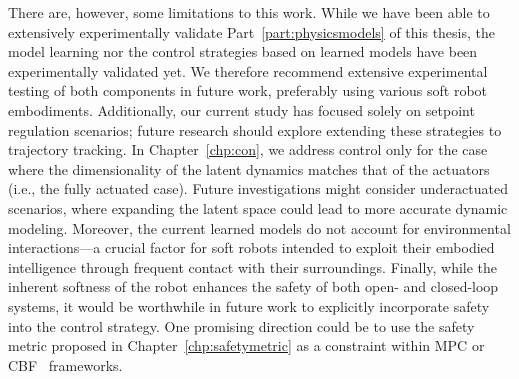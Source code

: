 There are, however, some limitations to this work. 
While we have been able to extensively experimentally validate Part~\ref{part:physicsmodels} of this thesis, the model learning nor the control strategies based on learned models have been experimentally validated yet. We therefore recommend extensive experimental testing of both components in future work, preferably using various soft robot embodiments. Additionally, our current study has focused solely on setpoint regulation scenarios; future research should explore extending these strategies to trajectory tracking. In Chapter~\ref{chp:con}, we address control only for the case where the dimensionality of the latent dynamics matches that of the actuators (i.e., the fully actuated case). Future investigations might consider underactuated scenarios, where expanding the latent space could lead to more accurate dynamic modeling. Moreover, the current learned models do not account for environmental interactions—a crucial factor for soft robots intended to exploit their embodied intelligence through frequent contact with their surroundings. Finally, while the inherent softness of the robot enhances the safety of both open- and closed-loop systems, it would be worthwhile in future work to explicitly incorporate safety into the control strategy. One promising direction could be to use the safety metric proposed in Chapter~\ref{chp:safetymetric} as a constraint within \gls{MPC} or \gls{CBF}~\cite{ames2016control} frameworks.
